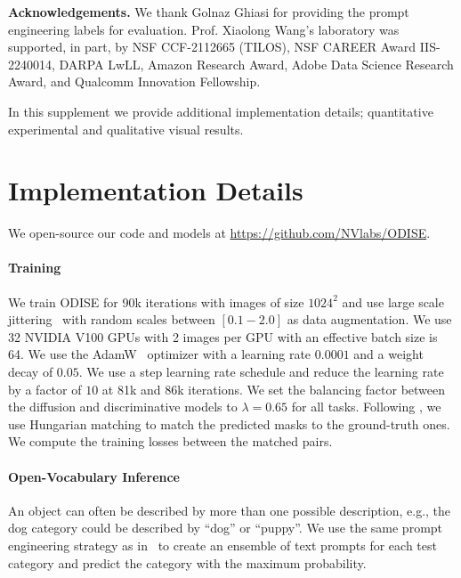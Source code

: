 \documentclass[10pt,twocolumn,letterpaper]{article}
\newcommand{\ourmethod}{ODISE}
\begin{document}
{\footnotesize \noindent \textbf{Acknowledgements.} 
We thank Golnaz Ghiasi for providing the prompt engineering labels for evaluation. 
Prof. Xiaolong Wang’s laboratory was supported, in part, by NSF CCF-2112665 (TILOS), NSF CAREER Award IIS-2240014, DARPA LwLL, Amazon Research Award, Adobe Data Science Research Award, and Qualcomm Innovation Fellowship.
}


{\small


}

\renewcommand\thefigure{\thesection.\arabic{figure}}
\renewcommand\thetable{\thesection.\arabic{table}}
\setcounter{figure}{0} 
\setcounter{table}{0} 

\appendix



In this supplement we provide additional implementation details; quantitative experimental and qualitative visual results.

\section{Implementation Details}

We open-source our code and models at \href{https://github.com/NVlabs/ODISE}{https://github.com/NVlabs/ODISE}.

\paragraph{Training}
We train \ourmethod{} for 90k iterations with images of size $1024^2$ and use large scale jittering~\cite{ghiasi2021simple} with random scales between $[0.1{-}2.0]$ as data augmentation.
We use 32 NVIDIA V100 GPUs with 2 images per GPU with an effective batch size is 64. 
We use the AdamW~\cite{loshchilov2017decoupled} optimizer with a learning rate $0.0001$ and a weight decay of $0.05$. 
We use a step learning rate schedule and reduce the learning rate by a factor of $10$ at 81k and 86k iterations.
We set the balancing factor between the diffusion and discriminative models to $\lambda=0.65$ for all tasks.
Following \cite{cheng2021maskformer,cheng2022mask2former, carion2020detr}, we use Hungarian matching to match the predicted masks to the ground-truth ones. We compute the training losses between the matched pairs.

\paragraph{Open-Vocabulary Inference}
An object can often be described by more than one possible description, e.g., the dog category could be described by ``dog'' or ``puppy''.
We use the same prompt engineering strategy as in~\cite{ghiasi2021open} to create an ensemble of text prompts for each test category and predict the category with the maximum probability.
\end{document}
